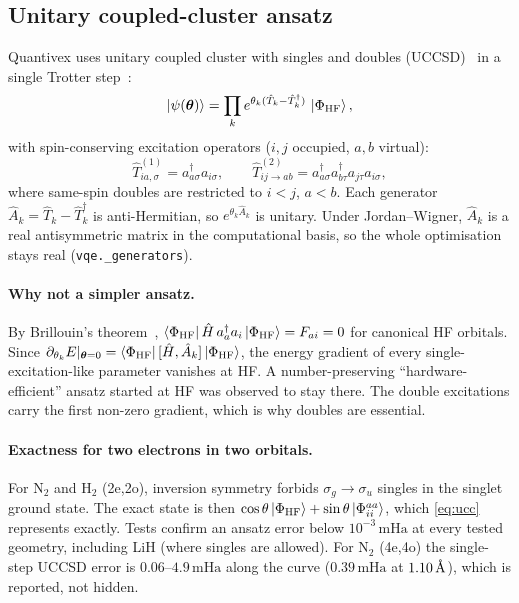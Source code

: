\documentclass[10pt,a4paper]{article}
\newcommand{\mHa}{\,\mathrm{mHa}}
\newcommand{\Ang}{\ensuremath{\,\text{\normalfont\AA}}}
\newcommand{\cre}[1]{a^{\dagger}_{#1}}
\newcommand{\ann}[1]{a_{#1}}
\newcommand{\code}[1]{\texttt{\small #1}}
\begin{document}
\subsection{Unitary coupled-cluster ansatz}
Quantivex uses unitary coupled cluster with singles and doubles (UCCSD)~\cite{Bartlett1989,Romero2018} in a single Trotter step~\cite{Trotter1959}:
\begin{equation}\label{eq:ucc}
\ket{\psi(\bm\theta)} = \prod_{k} e^{\theta_k (\hat T_k-\hat T_k^\dagger)}\,\ket{\Phi_{\mathrm{HF}}},
\end{equation}
with spin-conserving excitation operators ($i,j$ occupied, $a,b$ virtual):
\begin{equation}
\hat T^{(1)}_{ia,\sigma}=\cre{a\sigma}\ann{i\sigma},\qquad
\hat T^{(2)}_{ij\to ab}=\cre{a\sigma}\cre{b\tau}\ann{j\tau}\ann{i\sigma},
\end{equation}
where same-spin doubles are restricted to $i<j$, $a<b$. Each generator $\hat A_k=\hat T_k-\hat T_k^\dagger$ is anti-Hermitian, so $e^{\theta_k\hat A_k}$ is unitary. Under Jordan--Wigner, $\hat A_k$ is a real antisymmetric matrix in the computational basis, so the whole optimisation stays real (\code{vqe.\_generators}).

\paragraph{Why not a simpler ansatz.} By Brillouin's theorem~\cite{SzaboOstlund}, $\bra{\Phi_{\mathrm{HF}}}\hat H\,\cre a\ann i\ket{\Phi_{\mathrm{HF}}}=F_{ai}=0$ for canonical HF orbitals. Since $\partial_{\theta_k}E|_{\bm\theta=0}=\bra{\Phi_{\mathrm{HF}}}[\hat H,\hat A_k]\ket{\Phi_{\mathrm{HF}}}$, the energy gradient of every single-excitation-like parameter vanishes at HF. A number-preserving ``hardware-efficient'' ansatz started at HF was observed to stay there. The double excitations carry the first non-zero gradient, which is why doubles are essential.

\paragraph{Exactness for two electrons in two orbitals.} For N$_2$ and H$_2$ (2e,2o), inversion symmetry forbids $\sigma_g\to\sigma_u$ singles in the singlet ground state. The exact state is then $\cos\theta\ket{\Phi_{\mathrm{HF}}}+\sin\theta\ket{\Phi_{ii}^{aa}}$, which \eqref{eq:ucc} represents exactly. Tests confirm an ansatz error below $10^{-3}\mHa$ at every tested geometry, including LiH (where singles are allowed). For N$_2$ (4e,4o) the single-step UCCSD error is $0.06$--$4.9\mHa$ along the curve ($0.39\mHa$ at $1.10\Ang$), which is reported, not hidden.
\end{document}
